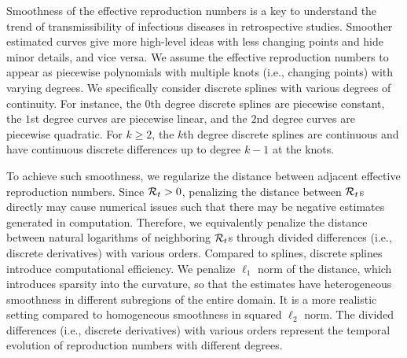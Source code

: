 Smoothness of the effective reproduction numbers is a key to understand the trend of transmissibility of infectious diseases in retrospective studies. Smoother estimated curves give more high-level ideas with less changing points and hide minor details, and vice versa. 
We assume the effective reproduction numbers to appear as piecewise polynomials with multiple knots (i.e., changing points) with varying degrees. We specifically consider discrete splines with various degrees of continuity. For instance, the $0$th degree discrete splines are piecewise constant, the $1$st degree curves are piecewise linear, and the $2$nd degree curves are piecewise quadratic. For $k\geq 2$, the $k$th degree discrete splines are continuous and have continuous discrete differences up to degree $k-1$ at the knots. 

To achieve such smoothness, we regularize the distance between adjacent effective reproduction numbers. Since $\mathcal{R}_t > 0$, penalizing the distance between $\mathcal{R}_t$s directly may cause numerical issues such that there may be negative estimates generated in computation. Therefore, we equivalently penalize the distance between natural logarithms of neighboring $\mathcal{R}_t$s through divided differences (i.e., discrete derivatives) with various orders.  
Compared to splines, discrete splines introduce computational efficiency. 
We penalize $\ell_1$ norm of the distance, which introduces sparsity into the curvature, so that the estimates have heterogeneous smoothness in different subregions of the entire domain. It is a more realistic setting compared to homogeneous smoothness in squared $\ell_2$ norm. 
The divided differences (i.e., discrete derivatives) with various orders represent the temporal evolution of reproduction numbers with different degrees. 

